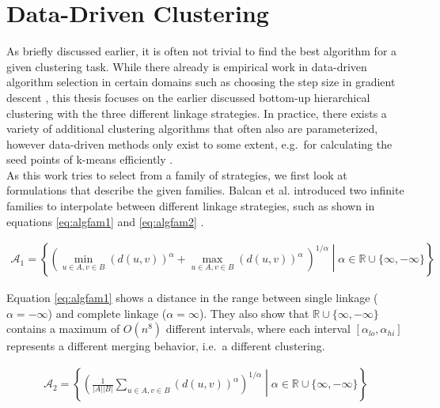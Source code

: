 \section{Data-Driven Clustering}

As briefly discussed earlier, it is often not trivial to find the best algorithm for a given clustering task. While there already is empirical work in data-driven algorithm selection in certain domains such as choosing the step size in gradient descent \cite{DBLP:journals/corr/GuptaR15b}, this thesis focuses on the earlier discussed bottom-up hierarchical clustering with the three different linkage strategies. In practice, there exists a variety of additional clustering algorithms that often also are parameterized, however data-driven methods only exist to some extent, e.g.\ for calculating the seed points of k-means efficiently \cite{arthur2007k}.\\

As this work tries to select from a family of strategies, we first look at formulations that describe the given families. Balcan et al. introduced two infinite families to interpolate between different linkage strategies, such as shown in equations \ref{eq:algfam1} and \ref{eq:algfam2} \cite{DBLP:journals/corr/BalcanNVW16}.

\begin{equation}
    \begin{aligned}
        \mathcal{A}_1 = \left\{ \left( \min\limits_{u \in A, v \in B} (d(u,v))^\alpha + \max\limits_{u \in A, v \in B} (d(u,v))^\alpha\ \right)^{1 / \alpha} \middle| \alpha \in \mathbb{R} \cup \{\infty, -\infty\} \right\}
    \end{aligned}
    \label{eq:algfam1}
\end{equation}

Equation \ref{eq:algfam1} shows a distance in the range between single linkage ($\alpha = -\infty$) and complete linkage ($\alpha = \infty$). They also show that $\mathbb{R} \cup \{\infty, -\infty\}$ contains a maximum of $O(n^8)$ different intervals, where each interval $[\alpha_{lo}, \alpha_{hi}]$ represents a different merging behavior, i.e.\ a different clustering.

\begin{equation}
    \begin{aligned}
        \mathcal{A}_2 = \left\{ \left( \frac{1}{|A| |B|} \sum\limits_{u \in A, v \in B} (d(u,v))^\alpha \right)^{1 / \alpha} \middle| \alpha \in \mathbb{R} \cup \{\infty, -\infty\} \right\}
    \end{aligned}
    \label{eq:algfam2}
\end{equation}


